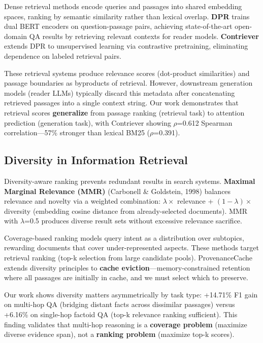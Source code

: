 Dense retrieval methods encode queries and passages into shared embedding spaces, ranking by semantic similarity rather than lexical overlap. \textbf{DPR} \cite{karpukhin2020dpr} trains dual BERT encoders on question-passage pairs, achieving state-of-the-art open-domain QA results by retrieving relevant contexts for reader models. \textbf{Contriever} \cite{izacard2022contriever} extends DPR to unsupervised learning via contrastive pretraining, eliminating dependence on labeled retrieval pairs.

These retrieval systems produce relevance scores (dot-product similarities) and passage boundaries as byproducts of retrieval. However, downstream generation models (reader LLMs) typically discard this metadata after concatenating retrieved passages into a single context string. Our work demonstrates that retrieval scores \textbf{generalize} from passage ranking (retrieval task) to attention prediction (generation task), with Contriever showing $\rho$=0.612 Spearman correlation—57\% stronger than lexical BM25 ($\rho$=0.391).

\subsection{Diversity in Information Retrieval}

Diversity-aware ranking prevents redundant results in search systems. \textbf{Maximal Marginal Relevance (MMR)} (Carbonell \& Goldstein, 1998) balances relevance and novelty via a weighted combination: $\lambda \times$ relevance + $(1-\lambda) \times$ diversity (embedding cosine distance from already-selected documents). MMR with $\lambda$=0.5 produces diverse result sets without excessive relevance sacrifice.

Coverage-based ranking \cite{clarke2008novelty} models query intent as a distribution over subtopics, rewarding documents that cover under-represented aspects. These methods target retrieval ranking (top-k selection from large candidate pools). ProvenanceCache extends diversity principles to \textbf{cache eviction}—memory-constrained retention where all passages are initially in cache, and we must select which to preserve.

Our work shows diversity matters asymmetrically by task type: +14.71\% F1 gain on multi-hop QA (bridging distant facts across dissimilar passages) versus +6.16\% on single-hop factoid QA (top-k relevance ranking sufficient). This finding validates that multi-hop reasoning is a \textbf{coverage problem} (maximize diverse evidence span), not a \textbf{ranking problem} (maximize top-k scores).

